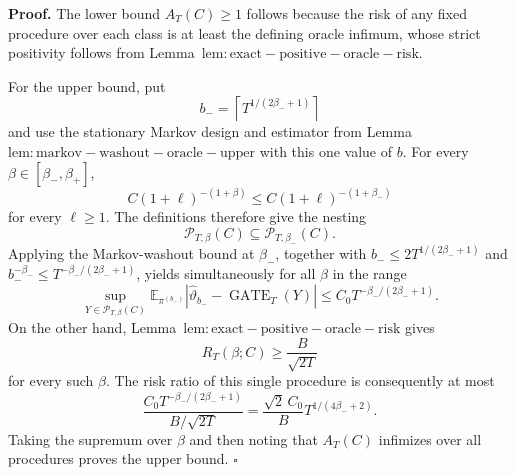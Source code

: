 \textbf{Proof.} The lower bound \(A_T(C)\ge1\) follows because the risk of any fixed procedure over each class is at least the defining oracle infimum, whose strict positivity follows from Lemma~\(\mathrm{lem:exact-positive-oracle-risk}\).

For the upper bound, put
\[
b_-=\left\lceil T^{1/(2\beta_-+1)}\right\rceil
\]
and use the stationary Markov design and estimator from Lemma~\(\mathrm{lem:markov-washout-oracle-upper}\) with this one value of \(b\). For every \(\beta\in[\beta_-,\beta_+]\),
\[
C(1+\ell)^{-(1+\beta)}\le C(1+\ell)^{-(1+\beta_-)}
\]
for every \(\ell\ge1\). The definitions therefore give the nesting
\[
\mathcal P_{T,\beta}(C)\subseteq\mathcal P_{T,\beta_-}(C).
\]
Applying the Markov-washout bound at \(\beta_-\), together with \(b_-\le2T^{1/(2\beta_-+1)}\) and \(b_-^{-\beta_-}\le T^{-\beta_-/(2\beta_-+1)}\), yields simultaneously for all \(\beta\) in the range
\[
\sup_{Y\in\mathcal P_{T,\beta}(C)}
\mathbb E_{\pi^{(b_-)}}
\left|\widehat\vartheta_{b_-}-\operatorname{GATE}_T(Y)\right|
\le C_0T^{-\beta_-/(2\beta_-+1)}.
\]
On the other hand, Lemma~\(\mathrm{lem:exact-positive-oracle-risk}\) gives
\[
R_T(\beta;C)\ge\frac{B}{\sqrt{2T}}
\]
for every such \(\beta\). The risk ratio of this single procedure is consequently at most
\[
\frac{C_0T^{-\beta_-/(2\beta_-+1)}}{B/\sqrt{2T}}
=\frac{\sqrt2\,C_0}{B}T^{1/(4\beta_-+2)}.
\]
Taking the supremum over \(\beta\) and then noting that \(A_T(C)\) infimizes over all procedures proves the upper bound. \(\square\)